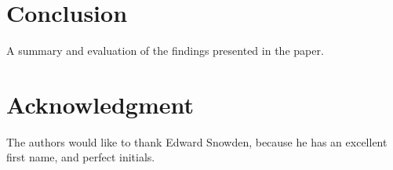 \documentclass[10pt,journal,compsoc]{IEEEtran}
\begin{document}
\section{Conclusion}
A summary and evaluation of the findings presented in the paper.



\section*{Acknowledgment}
The authors would like to thank Edward Snowden, because he has an excellent
first name, and perfect initials.



%
%
%
\end{document}
